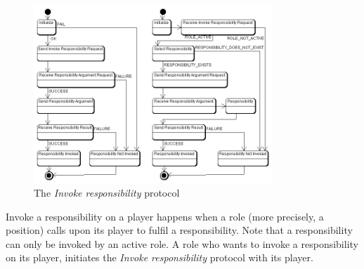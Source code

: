\begin{figure}[ht]
	\centering
	\includegraphics[width=0.8\textwidth]{images/thespian/invoke-responsibility-protocol.png}
	\caption{The \textit{Invoke responsibility} protocol}
	\label{figure:thespian-invoke-responsibility-protocol}
\end{figure}

Invoke a responsibility on a player happens when a role (more precisely, a position) calls upon its player to fulfil a responsibility.
Note that a responsibility can only be invoked by an active role.
A role who wants to invoke a responsibility on its player, initiates the \textit{Invoke responsibility} protocol with its player.

